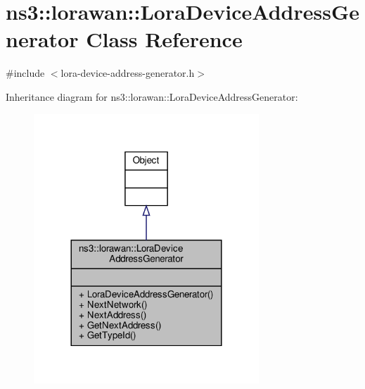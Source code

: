 \hypertarget{classns3_1_1lorawan_1_1LoraDeviceAddressGenerator}{}\section{ns3\+:\+:lorawan\+:\+:Lora\+Device\+Address\+Generator Class Reference}
\label{classns3_1_1lorawan_1_1LoraDeviceAddressGenerator}


{\ttfamily \#include $<$lora-\/device-\/address-\/generator.\+h$>$}



Inheritance diagram for ns3\+:\+:lorawan\+:\+:Lora\+Device\+Address\+Generator\+:
\nopagebreak
\begin{figure}[H]
\begin{center}
\leavevmode
\includegraphics[width=240pt]{classns3_1_1lorawan_1_1LoraDeviceAddressGenerator__inherit__graph}
\end{center}
\end{figure}


